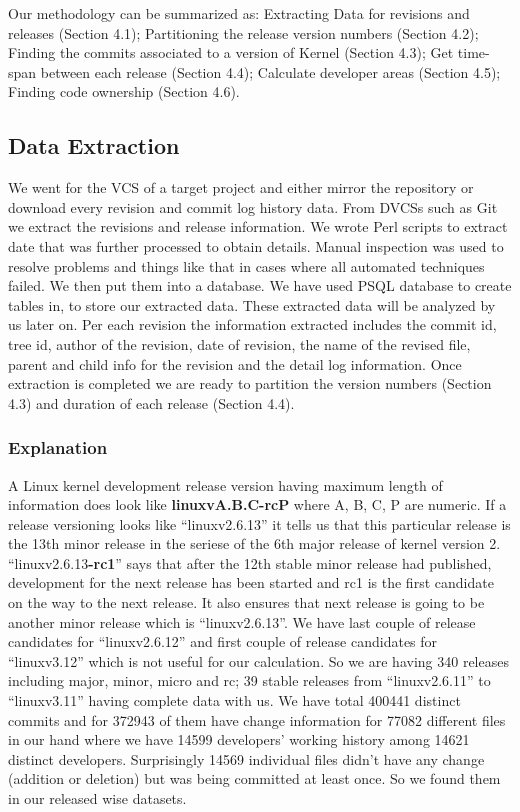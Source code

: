 \documentclass{acm_proc_article-sp}
\begin{document}
Our methodology can be summarized as: Extracting Data for revisions and releases (Section 4.1); Partitioning the release version numbers (Section 4.2); Finding the commits associated to a version of Kernel (Section 4.3); Get time-span between each release (Section 4.4); Calculate developer areas (Section 4.5); Finding code ownership (Section 4.6).

\subsection{Data Extraction}
We went for the VCS of a target project and either mirror the repository or download every revision and commit log history data. From DVCSs such as Git we extract the revisions and release information. We wrote Perl scripts to extract date that was further processed to obtain details. Manual inspection was used to resolve problems and things like that in cases where all automated techniques failed.
We then put them into a database. We have used PSQL database to create tables in, to store our extracted data. These extracted data will be analyzed by us later on. Per each revision the information extracted includes the commit id, tree id, author of the revision, date of revision, the name of the revised file, parent and child info for the revision and the detail log information. Once extraction is completed we are ready to partition the version numbers (Section 4.3) and duration  of each release (Section 4.4).

\subsubsection{Explanation}
A Linux kernel development release version having maximum length of information does look like \textbf{linuxvA.B.C-rcP} where A, B, C, P are numeric. If a release versioning looks like ``linuxv2.6.13'' it tells us that this particular release is the 13th minor release  in the seriese of the 6th major release of kernel version 2. ``linuxv2.6.13\textbf{-rc1}'' says that after the 12th stable minor release had published, development for the next release has been started and rc1 is the first candidate on the way to the next release. It also ensures that next release is going to be another minor release which is ``linuxv2.6.13''. We have last couple of release candidates for ``linuxv2.6.12'' and first couple of release candidates for ``linuxv3.12'' which is not useful for our calculation. So we are having 340 releases including major, minor, micro and rc; 39 stable releases from ``linuxv2.6.11'' to ``linuxv3.11'' having complete data with us. We have total 400441 distinct commits and for 372943 of them have change information for 77082 different files in our hand where we have 14599 developers' working history among 14621 distinct developers. Surprisingly 14569 individual files didn't have any change (addition or deletion) but was being committed at least once. So we found them in our released wise datasets.
\end{document}
